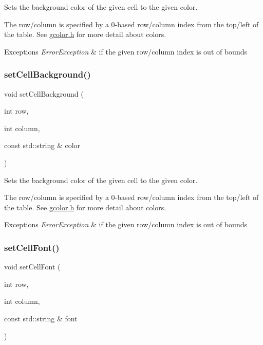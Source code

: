 Sets the background color of the given cell to the given color. 

The row/column is specified by a 0-\/based row/column index from the top/left of the table. See \mbox{\hyperlink{gcolor_8h_source}{gcolor.\+h}} for more detail about colors. 
\begin{DoxyExceptions}{Exceptions}
{\em Error\+Exception} & if the given row/column index is out of bounds \\
\hline
\end{DoxyExceptions}
\mbox{\label{classsgl_1_1GTable_af2d2fa204d2f9260081102a990310cd7}} 
\subsubsection{\texorpdfstring{set\+Cell\+Background()}{setCellBackground()}\hspace{0.1cm}{\footnotesize\ttfamily [2/2]}}
{\footnotesize\ttfamily void set\+Cell\+Background (\begin{DoxyParamCaption}\item[{int}]{row,  }\item[{int}]{column,  }\item[{const std\+::string \&}]{color }\end{DoxyParamCaption})\hspace{0.3cm}{\ttfamily [virtual]}}



Sets the background color of the given cell to the given color. 

The row/column is specified by a 0-\/based row/column index from the top/left of the table. See \mbox{\hyperlink{gcolor_8h_source}{gcolor.\+h}} for more detail about colors. 
\begin{DoxyExceptions}{Exceptions}
{\em Error\+Exception} & if the given row/column index is out of bounds \\
\hline
\end{DoxyExceptions}
\mbox{\label{classsgl_1_1GTable_a8c3d80b0163f465c7306b075d5895313}} 
\subsubsection{\texorpdfstring{set\+Cell\+Font()}{setCellFont()}}
{\footnotesize\ttfamily void set\+Cell\+Font (\begin{DoxyParamCaption}\item[{int}]{row,  }\item[{int}]{column,  }\item[{const std\+::string \&}]{font }\end{DoxyParamCaption})\hspace{0.3cm}{\ttfamily [virtual]}}



